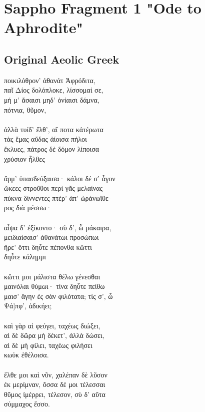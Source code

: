 
\section*{Sappho Fragment 1 "Ode to Aphrodite"}
\begin{multicols}{2}
  \subsection*{Original Aeolic Greek}
  \noindent
  ποικιλόθρον' ἀθανάτ Ἀφρόδιτα,\\
  \noindent
  παῖ Δίος δολόπλοκε, λίσσομαί σε,\\
  \noindent
  μή μ' ἄσαισι μηδ' ὀνίαισι δάμνα,\\
  \noindent
  πότνια, θῦμον,\\
  \\
  \noindent
  ἀλλὰ τυίδ' ἔλθ', αἴ ποτα κἀτέρωτα\\
  \noindent
  τὰς ἔμας αὔδας ἀίοισα πήλοι\\
  \noindent
  ἔκλυες, πάτρος δὲ δόμον λίποισα\\
  \noindent
  χρύσιον ἦλθες\\
  \\
  \noindent
  ἄρμ' ὐπασδεύξαισα· κάλοι δέ σ' ἆγον\\
  \noindent
  ὤκεες στροῦθοι περὶ γᾶς μελαίνας\\
  \noindent
  πύκνα δίννεντες πτέρ' ἀπ' ὠράνωἴθε-\\
  \noindent
  ρος διὰ μέσσω·\\
  \\
  \noindent
  αἶψα δ' ἐξίκοντο· σὺ δ', ὦ μάκαιρα,\\
  \noindent
  μειδιαίσαισ' ἀθανάτωι προσώπωι\\
  \noindent
  ἤρε' ὄττι δηὖτε πέπονθα κὤττι\\
  \noindent
  δηὖτε κάλημμι\\
  \\
  \noindent
  κὤττι μοι μάλιστα θέλω γένεσθαι\\
  \noindent
  μαινόλαι θύμωι· τίνα δηὖτε πείθω\\
  \noindent
  μαισ' ἄγην ἐς σὰν φιλότατα; τίς σ', ὦ\\
  \noindent
  Ψά]πφ', ἀδικήει;\\
  \\
  \noindent
  καὶ γὰρ αἰ φεύγει, ταχέως διώξει,\\
  \noindent
  αἰ δὲ δῶρα μὴ δέκετ', ἀλλὰ δώσει,\\
  \noindent
  αἰ δὲ μὴ φίλει, ταχέως φιλήσει\\
  \noindent
  κωὐκ ἐθέλοισα.\\
  \\
  \noindent
  ἔλθε μοι καὶ νῦν, χαλέπαν δὲ λῦσον\\
  \noindent
  ἐκ μερίμναν, ὄσσα δέ μοι τέλεσσαι\\
  \noindent
  θῦμος ἰμέρρει, τέλεσον, σὺ δ' αὔτα\\
  \noindent
  σύμμαχος ἔσσο.


\end{multicols}
